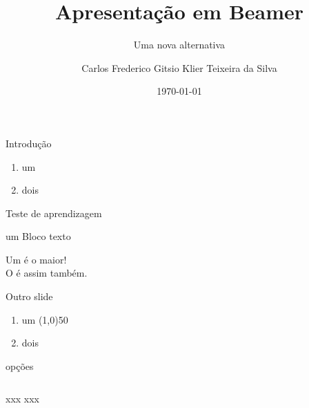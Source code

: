 \documentclass{beamer}
\title[título curto]{Apresentação em Beamer}
\subtitle[subt curto]{Uma nova alternativa}
\author[Fred Klier]{Carlos Frederico Gitsio Klier Teixeira da Silva}
\institute{Colégio Nossa Senhora Medianeira}
\date[dd/mm/yyyy]{\today}
\begin{document}

\begin{frame}
		\maketitle
\end{frame}

	\begin{frame}[t]{Introdução}\vspace{10pt} %

		\begin{enumerate}
			\item um
			\item dois
		\end{enumerate}
	\end{frame}

\begin{frame}[t]{Teste de aprendizagem}\vspace{10pt} %

	\begin{block}{um Bloco}
		\vspace{0.5em}
		texto
		\vspace{0.5em}
	\end{block}
	Um    é o maior!\\[10]
	O \only<1>{\line(1,0){50} \,}   é assim também.
\end{frame}

\begin{frame}[t]{Outro slide}\vspace{10pt} %

	\begin{enumerate}
		\item um \line(1,0){50}
		\item dois
	\end{enumerate}
\end{frame}

\begin{frame}[t]{opções}\vspace{10pt} %
	\begin{columns}[onlytextwith] %
		\columns[0.5\textwidth]
		xxx
		\columns[0.5\textwidth]
		xxx
	\end{columns}
\end{frame}
\end{document}
